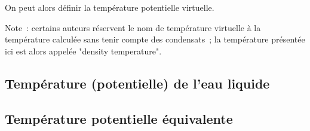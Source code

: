 \documentclass{article}
\begin{document}
On peut alors définir la température potentielle virtuelle.

Note~: certains auteurs réservent le nom de température virtuelle à la température calculée sans tenir compte des condensats~; la température présentée ici est alors appelée "density temperature".

\subsection{Température (potentielle) de l'eau liquide}
\label{theta_l}

\subsection{Température potentielle équivalente}
\label{theta_e}
\end{document}
